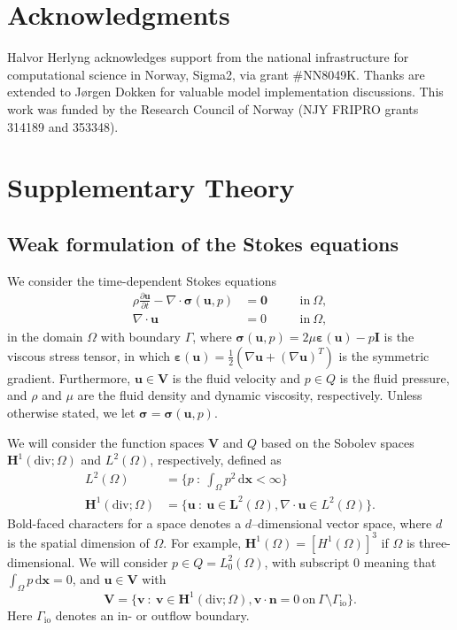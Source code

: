 \documentclass[fleqn]{wlscirep}
\newcommand{\pdifft}[1]{\frac{\partial  #1}{\partial t}}
\newcommand{\intO}[1]{\int_{\Omega}#1 \, \mathrm d\bm{x}}
\newcommand{\nn}{\mathbf{n}}
\newcommand{\uu}{\mathbf{u}}
\newcommand{\vv}{\mathbf{v}}
\newcommand{\VV}{\mathbf{V}}
\newcommand{\bsig}{\bm{\sigma}}
\newcommand{\beps}{\bm{\varepsilon}}
\begin{document}
\section*{Acknowledgments}
Halvor Herlyng acknowledges support from the national infrastructure for computational
science in Norway, Sigma2, via grant \#NN8049K. Thanks are extended to J\o rgen Dokken
for valuable model implementation discussions.
This work was funded by the Research Council of Norway (NJY FRIPRO grants 314189 and 353348).
\newpage


\appendix
\section{Supplementary Theory}
\subsection{Weak formulation of the Stokes equations}\label{subsec:appendixA1}
We consider the time-dependent Stokes equations
\begin{subequations}
\begin{alignat}{2}
   \rho\pdifft{\uu} - \nabla \cdot \bsig(\uu, p) &= \mathbf{0} \quad &&\mathrm{in} \ \Omega, \label{eq:BDM_stokes_mom}\\
  \nabla \cdot \uu &= 0 \quad &&\mathrm{in} \ \Omega, \label{eq:BDM_stokes_div} 
\end{alignat}
\label{eq:appendix_stokes_eqs}%
\end{subequations}%
in the domain $\Omega$ with boundary $\Gamma$, where
$\bsig(\uu, p) = 2\mu\beps(\uu) - p\mathbf{I}$ is the viscous
stress tensor, in which $\beps(\uu) = \frac{1}{2}(\nabla\uu + (\nabla\uu)^T)$
is the symmetric gradient. Furthermore, $\uu\in\VV$ is the fluid velocity
and $p\in Q$ is the fluid pressure, and $\rho$ and $\mu$ are the fluid density
and dynamic viscosity, respectively. Unless otherwise stated, we let $\bsig = \bsig(\uu, p)$. 

We will consider the function spaces $\VV$ and $Q$ based on the
Sobolev spaces $\mathbf{H}^1(\mathrm{div}; \Omega)$ and $L^2(\Omega)$,
respectively, defined as 
\begin{align*}
    L^2(\Omega) &= \bigg\{p \ : \ \intO{p^2} < \infty\bigg\} \\
    \mathbf{H}^1(\mathrm{div}; \Omega) &= \bigg\{\uu \ : \ \uu\in\mathbf{L}^2(\Omega), \nabla\cdot\uu\in L^2(\Omega)\bigg\}.
\end{align*}
Bold-faced characters for a space denotes a $d$--dimensional vector space,
where $d$ is the spatial dimension of $\Omega$. For example,
$\mathbf{H}^1(\Omega) = [H^1(\Omega)]^3$ if $\Omega$ is three-dimensional.
We will consider $p\in Q=L^2_0(\Omega)$, with subscript 0 meaning
that $\intO{p} = 0$, and $\uu\in\VV$ with
\begin{equation*}
    \VV =  \bigg\{\vv \ : \ \vv\in\mathbf{H}^1(\mathrm{div}; \Omega), \vv\cdot\nn=0 \ \mathrm{on} \ \Gamma\setminus\Gamma_{\mathrm{io}}\bigg\}.
\end{equation*}
Here $\Gamma_{\mathrm{io}}$ denotes an in- or outflow boundary. 
\end{document}
